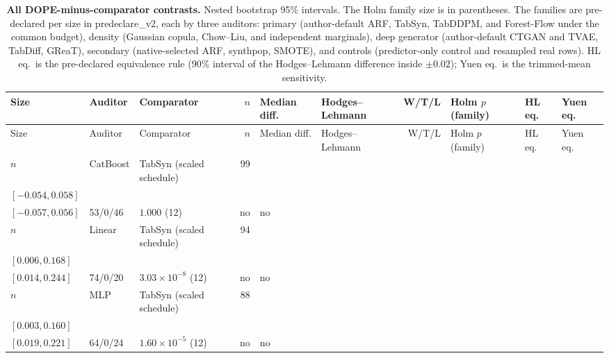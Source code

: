 \begin{longtable}{@{}ll>{\raggedright\arraybackslash}p{1.1in}rllrlll@{}}
\caption{\textbf{All DOPE-minus-comparator contrasts.} Nested bootstrap 95\% intervals. The Holm family size is in parentheses. The families are pre-declared per size in predeclare\_v2, each by three auditors: primary (author-default ARF, TabSyn, TabDDPM, and Forest-Flow under the common budget), density (Gaussian copula, Chow--Liu, and independent marginals), deep generator (author-default CTGAN and TVAE, TabDiff, GReaT), secondary (native-selected ARF, synthpop, SMOTE), and controls (predictor-only control and resampled real rows). HL eq.\ is the pre-declared equivalence rule (90\% interval of the Hodges--Lehmann difference inside $\pm 0.02$); Yuen eq.\ is the trimmed-mean sensitivity.}\label{tab:v2-contrasts}\\
\toprule
Size & Auditor & Comparator & $n$ & Median diff. & Hodges--Lehmann & W/T/L & Holm $p$ (family) & HL eq. & Yuen eq. \\
\midrule
\endfirsthead
\toprule
Size & Auditor & Comparator & $n$ & Median diff. & Hodges--Lehmann & W/T/L & Holm $p$ (family) & HL eq. & Yuen eq. \\
\midrule
\endhead
$n$ & CatBoost & TabSyn (scaled schedule) & 99 & \begin{tabular}[t]{@{}l@{}}$0.004$\\\tiny$[-0.054, 0.058]$\end{tabular} & \begin{tabular}[t]{@{}l@{}}$0.002$\\\tiny$[-0.057, 0.056]$\end{tabular} & 53/0/46 & $1.000$ (12) & no & no \\
$n$ & Linear & TabSyn (scaled schedule) & 94 & \begin{tabular}[t]{@{}l@{}}$0.053$\\\tiny$[0.006, 0.168]$\end{tabular} & \begin{tabular}[t]{@{}l@{}}$0.098$\\\tiny$[0.014, 0.244]$\end{tabular} & 74/0/20 & $3.03\times 10^{-8}$ (12) & no & no \\
$n$ & MLP & TabSyn (scaled schedule) & 88 & \begin{tabular}[t]{@{}l@{}}$0.061$\\\tiny$[0.003, 0.160]$\end{tabular} & \begin{tabular}[t]{@{}l@{}}$0.100$\\\tiny$[0.019, 0.221]$\end{tabular} & 64/0/24 & $1.60\times 10^{-5}$ (12) & no & no \\

\end{longtable}
